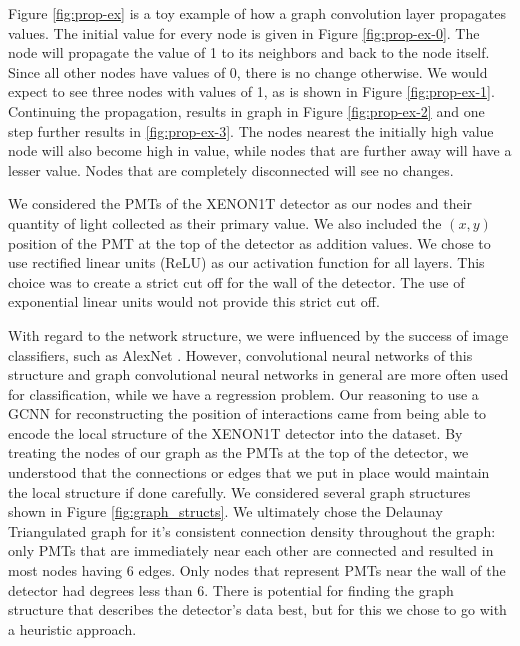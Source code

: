 \documentclass[thesis.tex]{subfiles}
\begin{document}
\par Figure \ref{fig:prop-ex} is a toy example of how a graph convolution layer propagates values.
The initial value for every node is given in Figure \ref{fig:prop-ex-0}.
The node will propagate the value of 1 to its neighbors and back to the node itself.
Since all other nodes have values of 0, there is no change otherwise.
We would expect to see three nodes with values of 1, as is shown in Figure \ref{fig:prop-ex-1}.
Continuing the propagation, results in graph in Figure \ref{fig:prop-ex-2} and one step further results in \ref{fig:prop-ex-3}.
The nodes nearest the initially high value node will also become high in value, while nodes that are further away will have a lesser value.
Nodes that are completely disconnected will see no changes.

\par We considered the PMTs of the XENON1T detector as our nodes and their quantity of light collected as their primary value.
We also included the $(x,y)$ position of the PMT at the top of the detector as addition values.
We chose to use rectified linear units (ReLU) as our activation function for all layers.
This choice was to create a strict cut off for the wall of the detector.
The use of exponential linear units would not provide this strict cut off.

\par With regard to the network structure, we were influenced by the success of image classifiers, such as AlexNet \cite{AlexNet}.
However, convolutional neural networks of this structure and graph convolutional neural networks in general are more often used for classification, while we have a regression problem.
Our reasoning to use a GCNN for reconstructing the position of interactions came from being able to encode the local structure of the XENON1T detector into the dataset.
By treating the nodes of our graph as the PMTs at the top of the detector, we understood that the connections or edges that we put in place would maintain the local structure if done carefully.
We considered several graph structures shown in Figure \ref{fig:graph_structs}.
We ultimately chose the Delaunay Triangulated graph for it's consistent connection density throughout the graph: only PMTs that are immediately near each other are connected and resulted in most nodes having 6 edges.
Only nodes that represent PMTs near the wall of the detector had degrees less than 6.
There is potential for finding the graph structure that describes the detector's data best, but for this we chose to go with a heuristic approach.
\end{document}
